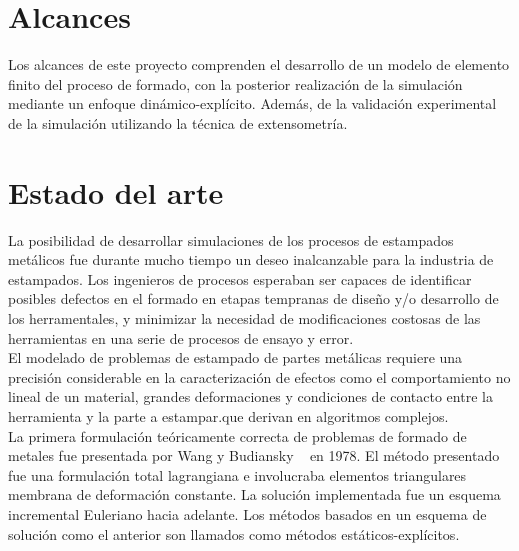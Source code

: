 \section{Alcances}

Los alcances de este proyecto comprenden el desarrollo de un modelo de elemento finito del proceso de 
formado, con la posterior realización de la simulación mediante un enfoque dinámico-explícito. Además, 
de la validación experimental de la simulación utilizando la técnica de extensometría.



\section{Estado del arte}

La posibilidad de desarrollar simulaciones de los procesos de estampados metálicos fue durante mucho tiempo 
un deseo inalcanzable para la industria de estampados. Los ingenieros de procesos esperaban ser capaces de 
identificar posibles defectos en el formado en etapas tempranas de diseño y/o desarrollo de los herramentales, 
y minimizar la necesidad de modificaciones costosas de las herramientas en una serie de procesos de ensayo y error. \\

El modelado de problemas de estampado de partes metálicas requiere una precisión considerable en la caracterización 
de efectos como el comportamiento no lineal de un material, grandes deformaciones y condiciones de contacto entre la
herramienta y la parte a estampar.que derivan  en algoritmos complejos.\cite{banabic2000}\\

La primera formulación teóricamente correcta de problemas de formado de metales fue presentada por 
Wang y Budiansky ~\cite{wang1978} en 1978. El método presentado fue una formulación total lagrangiana 
e involucraba elementos triangulares membrana de deformación constante. La solución implementada fue 
un esquema incremental Euleriano hacia adelante. Los métodos basados en un 
esquema de solución como el anterior son llamados como métodos estáticos-explícitos. \\

